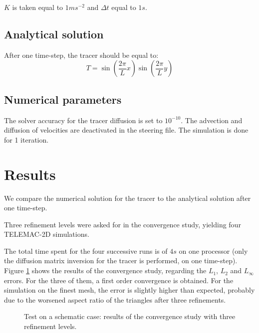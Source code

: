 $K$ is taken equal to $1 m s^{-2}$ and $\Delta t$ equal to $1s$.

\subsection{Analytical solution}

After one time-step, the tracer should be equal to:
\begin{equation}
T = \sin \left(\dfrac{2 \pi}{L}x \right) \sin \left( \dfrac{2 \pi}{L}y\right)
\end{equation}

\subsection{Numerical parameters}
The solver accuracy for the tracer diffusion is set to $10^{-10}$.
The advection and diffusion of velocities are deactivated in the steering file.
The simulation is done for 1 iteration.

\section{Results}
We compare the numerical solution for the tracer
to the analytical solution after one time-step.

Three refinement levels were asked for in the convergence study, yielding
four TELEMAC-2D simulations.

The total time spent for the four successive runs is of $4s$ on one processor
(only the diffusion matrix inversion for the tracer is performed, on one time-step).
Figure \ref{fig:figure2} shows the results of the convergence study, regarding
the $L_1$, $L_2$ and $L_{\infty}$ errors. For the three of them, a first order
convergence is obtained. For the simulation on the finest mesh, the error
is slightly higher than expected, probably due to the worsened aspect ratio
of the triangles after three refinements.
\begin{figure}
  \begin{center}
    \caption{Test on a schematic case: results of the convergence study
      with three refinement levels.}
    \label{fig:figure2}
  \end{center}
\end{figure}
